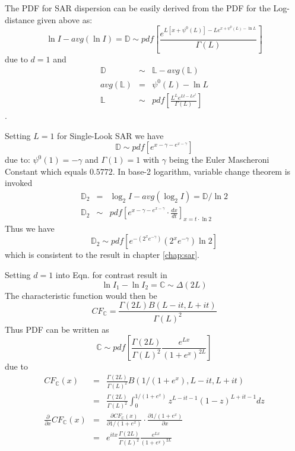 The PDF for SAR dispersion can be easily derived from
  the PDF for the Log-distance given above as:
  \begin{equation}
   \ln{I} - avg(\ln{I}) =  \mathbb{D} \sim pdf \left[ \frac{e^{L[x+\psi^0(L)]-Le^{x+\psi^0(L)-\ln{L}}}}{\Gamma(L)} \right]
  \end{equation}
due to $d=1$ and
\begin{eqnarray*}
  \mathbb{D} &\sim& \mathbb{L} - avg(\mathbb{L}) \\
  avg(\mathbb{L}) &=& \psi^0(L) - \ln{L} \\
  \mathbb{L} &\sim& pdf \left[ \frac{L^Le^{Lt-Le^t}}{ \Gamma(L)}  \right]
\end{eqnarray*}.

Setting $L=1$ for Single-Look SAR we have
\begin{equation}
  \mathbb{D} \sim pdf \left[ e^{x-\gamma-e^{x-\gamma}} \right]
\end{equation}
due to: $\psi^0(1)=-\gamma$ and $\Gamma(1)=1$
with $\gamma$ being the Euler Mascheroni Constant which equals $0.5772$. 
In base-2 logarithm, variable change theorem is invoked
\begin{eqnarray*}
  \mathbb{D}_2 &=& \log_2{I} - avg(\log_2{I}) = \mathbb{D}/\ln{2} \\
  \mathbb{D}_2 &\sim& pdf \left[ e^{x-\gamma-e^{x-\gamma}} \cdot \frac{dx}{dt} \right]_{x=t \cdot \ln2}
\end{eqnarray*}
Thus we have
\begin{equation}
  \mathbb{D}_2 \sim pdf \left[ e^{-(2^xe^{-\gamma})} (2^xe^{-\gamma}) \ln2 \right]
\end{equation}
which is consistent to the result in chapter \ref{chap:sar}.

Setting $d=1$ into Eqn. for contrast result in
\begin{equation}
  \ln{I_1} - \ln{I_2} = \mathbb{C} \sim \Delta(2L)
\end{equation}
The characteristic function would then be
\begin{equation}
  CF_\mathbb{C} =  \frac{\Gamma(2L) B(L-it,L+it)}{\Gamma(L)^2} 
\end{equation}
Thus PDF can be written as
\begin{equation}
  \mathbb{C} \sim pdf \left[ \frac{\Gamma(2L) }{\Gamma(L)^2} \frac{e^{Lx}}{(1+e^x)^{2L}} \right] \label{eqn:multi_look_SAR_contrast_pdf}
\end{equation}
due to
\begin{eqnarray*}
  CF_{\mathbb{C}}(x) &=& \frac{\Gamma(2L) }{\Gamma(L)^2} B(1/(1+e^x),L-it,L+it)  \\
       &=& \frac{\Gamma(2L) }{\Gamma(L)^2} \int^{1/(1+e^x)}_0 z^{L-it-1}(1-z)^{L+it-1} dz \\
  \frac{\partial }{\partial x} CF_{\mathbb{C}}(x) &=&  \frac{\partial CF_{\mathbb{C}}(x) }{\partial 1/(1+e^x)} \cdot \frac{\partial 1/(1+e^x)}{\partial x} \\
        &=&  e^{itx} \frac{\Gamma(2L) }{\Gamma(L)^2} \frac{e^{Lx}}{(1+e^x)^{2L}}   
\end{eqnarray*}

